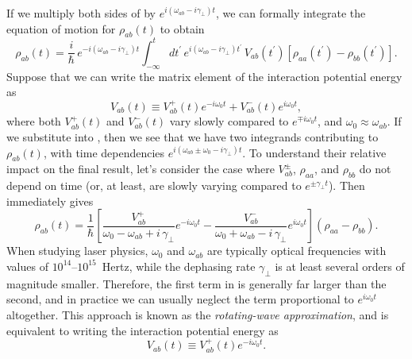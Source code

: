 If we multiply both sides of  by $e^{i ( \omega_{a b} - i \gamma_\perp) t}$, we can formally integrate the equation of motion for $\rho_{a b}(t)$ to obtain
 \begin{equation} \label{eqn:tls_dmem_ab_int_formal}
\rho_{a b}(t) = \frac{i}{\hslash}\, e^{-i ( \omega_{a b} - i \gamma_\perp) t} \int_{-\infty}^t d t^\prime\, e^{i ( \omega_{a b} - i \gamma_\perp) t^\prime}\, V_{a b}\left(t^\prime\right) \left[\rho_{a a}\left(t^\prime\right) - \rho_{b b}\left(t^\prime\right)\right] .
 \end{equation}
Suppose that we can write the matrix element of the interaction potential energy as
 \begin{equation} \label{eqn:tls_vab_exp}
V_{a b}(t) \equiv V_{a b}^{+}(t) e^{-i \omega_0 t} + V_{a b}^{-}(t) e^{i \omega_0 t} ,
 \end{equation}
where both $V_{a b}^{+}(t)$ and $V_{a b}^{-}(t)$ vary slowly compared to $e^{\mp i \omega_0 t}$, and $\omega_0 \approx \omega_{a b}$. If we substitute  into , then we see that we have two integrands contributing to $\rho_{a b}(t)$, with time dependencies $e^{i (\omega_{a b} \pm \omega_0 - i \gamma_\perp) t}$. To understand their relative impact on the final result, let's consider the case where $V_{a b}^\pm$, $\rho_{a a}$, and $\rho_{b b}$ do not depend on time (or, at least, are slowly varying compared to $e^{\pm \gamma_\perp t}$). Then  immediately gives
 \begin{equation} \label{eqn:tls_dmem_ab_int_formal_ss}
\rho_{a b}(t) = \frac{1}{\hslash} \left[ \frac{V_{a b}^{+}}{\omega_0 - \omega_{a b} + i\, \gamma_\perp} e^{-i \omega_0 t} - \frac{V_{a b}^{-}}{\omega_0 + \omega_{a b} - i\, \gamma_\perp} e^{i \omega_0 t} \right] \left( \rho_{a a} - \rho_{b b} \right) .
 \end{equation}
When studying laser physics, $\omega_0$ and $\omega_{a b}$ are typically optical frequencies with values of $10^{14}$--$10^{15}$~Hertz, while the dephasing rate $\gamma_\perp$ is at least several orders of magnitude smaller. Therefore, the first term in  is generally far larger than the second, and in practice we can usually neglect the term proportional to $e^{i \omega_0 t}$ altogether. This approach is known as the \emph{rotating-wave approximation}, and is equivalent to writing the interaction potential energy as
 \begin{equation} \label{eqn:tls_vab_rwa}
V_{a b}(t) \equiv V_{a b}^{+}(t) e^{-i \omega_0 t} .
 \end{equation}

